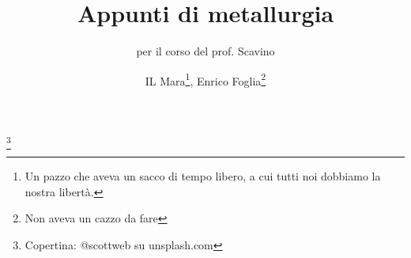 \documentclass[
	fontsize=10pt, 
	twoside=true, 
	numbers=noenddot, 
]{kaobook}
\begin{document}


\title[Appunti di metallurgia]{Appunti di metallurgia}
\subtitle{per il corso del prof. Scavino}
\author[Enrico Foglia, IL Mara]{IL Mara\thanks{Un pazzo che aveva un sacco di tempo libero, a cui tutti noi dobbiamo la nostra libertà.}, Enrico Foglia\thanks{Non aveva un cazzo da fare}}\footnote[0]{Copertina: @scottweb su unsplash.com}
\date{}

\frontmatter

\makeatletter
\lowertitleback{
\textbf{Disclaimer}\\
Gli appunti che seguono sono i leggendari appunti del Mara, rivisti e riproposti in una veste grafica più carina da Enrico Foglia.\\
Il corso di Scavino, si sa, è un giungla con tanto di vietcong, dunque si spera che negli anni questa raccolta di sapere possa essere ampliata e migliorata fino alla perfezione. I margini larghi sono pensati apposta per poter contenere di anno in anno le novità del nostro professore preferito. Usate questi appunti senza ritegno, scarabocchiate, spotacciate e migliorate tutto quello che vi sentite. Solo: non vendeteli. Sono pensati come strumento per superare insieme un momento difficile, quindi non fate gli stronzi.
}
\makeatother


\maketitle
{}

\begingroup %

\setlength{\textheight}{23cm} %

\etocstandarddisplaystyle %
\etocstandardlines %

\tableofcontents %

\endgroup


\mainmatter
{}














\appendix
{} %



\printindex
\end{document}

